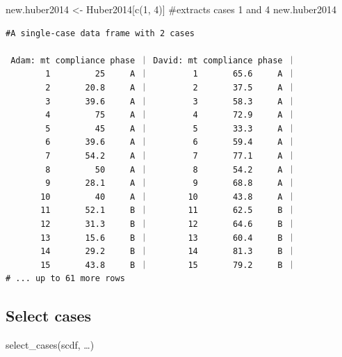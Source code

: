 \documentclass[
  letterpaper,
  DIV=11,
  numbers=noendperiod]{scrreprt}
\newenvironment{Shaded}{\begin{snugshade}}{\end{snugshade}}
\newcommand{\CommentTok}[1]{\textcolor[rgb]{0.37,0.37,0.37}{#1}}
\newcommand{\DecValTok}[1]{\textcolor[rgb]{0.68,0.00,0.00}{#1}}
\newcommand{\FunctionTok}[1]{\textcolor[rgb]{0.28,0.35,0.67}{#1}}
\newcommand{\NormalTok}[1]{\textcolor[rgb]{0.00,0.23,0.31}{#1}}
\newcommand{\OtherTok}[1]{\textcolor[rgb]{0.00,0.23,0.31}{#1}}
\begin{document}
\begin{Shaded}
\begin{Highlighting}[]
\NormalTok{new.huber2014 }\OtherTok{\textless{}{-}}\NormalTok{ Huber2014[}\FunctionTok{c}\NormalTok{(}\DecValTok{1}\NormalTok{, }\DecValTok{4}\NormalTok{)] }\CommentTok{\#extracts cases 1 and 4}
\NormalTok{new.huber2014}
\end{Highlighting}
\end{Shaded}

\begin{verbatim}
#A single-case data frame with 2 cases

 Adam: mt compliance phase ｜ David: mt compliance phase ｜
        1         25     A ｜         1       65.6     A ｜
        2       20.8     A ｜         2       37.5     A ｜
        3       39.6     A ｜         3       58.3     A ｜
        4         75     A ｜         4       72.9     A ｜
        5         45     A ｜         5       33.3     A ｜
        6       39.6     A ｜         6       59.4     A ｜
        7       54.2     A ｜         7       77.1     A ｜
        8         50     A ｜         8       54.2     A ｜
        9       28.1     A ｜         9       68.8     A ｜
       10         40     A ｜        10       43.8     A ｜
       11       52.1     B ｜        11       62.5     B ｜
       12       31.3     B ｜        12       64.6     B ｜
       13       15.6     B ｜        13       60.4     B ｜
       14       29.2     B ｜        14       81.3     B ｜
       15       43.8     B ｜        15       79.2     B ｜
# ... up to 61 more rows
\end{verbatim}

\hypertarget{sec-select-cases}{%
\subsection{Select cases}\label{sec-select-cases}}

\begin{tcolorbox}[enhanced jigsaw, toprule=.15mm, colframe=quarto-callout-tip-color-frame, left=2mm, colback=white, breakable, bottomrule=.15mm, arc=.35mm, rightrule=.15mm, leftrule=.75mm, opacityback=0]
\begin{minipage}[t]{5.5mm}
\textcolor{quarto-callout-tip-color}{\faLightbulb}
\end{minipage}%
\begin{minipage}[t]{\textwidth - 5.5mm}
select\_cases(scdf, \ldots)\end{minipage}%
\end{tcolorbox}
\end{document}
